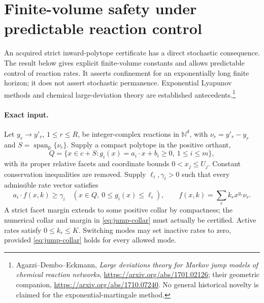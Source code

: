 \documentclass[11pt]{article}
\theoremstyle{definition}
\theoremstyle{remark}
\numberwithin{equation}{section}
\begin{document}
\section{Finite-volume safety under predictable reaction control}
\label{app:jump-safety}

An acquired strict inward-polytope certificate has a direct stochastic
consequence. The result below gives explicit finite-volume constants and
allows predictable control of reaction rates. It asserts confinement for
an exponentially long finite horizon; it does not assert stochastic
permanence. Exponential Lyapunov methods and chemical large-deviation
theory are established antecedents.\footnote{Agazzi--Dembo--Eckmann,
\emph{Large deviations theory for Markov jump models of chemical reaction
networks}, \url{https://arxiv.org/abs/1701.02126}; their geometric companion,
\url{https://arxiv.org/abs/1710.07240}. No general historical novelty is
claimed for the exponential-martingale method.}

\paragraph{Exact input.}
Let $y_r\to y'_r$, $1\le r\le R$, be integer-complex reactions in
$\mathbb N^d$, with $\nu_r=y'_r-y_r$ and
$S=\operatorname{span}_{\mathbb R}\{\nu_r\}$. Supply a compact polytope
in the positive orthant,
\[
 Q=\{x\in c+S:g_i(x)=a_i\cdot x+b_i\ge0,
                         \ 1\le i\le m\},
\]
with its proper relative facets and coordinate bounds $0<x_j\le U_j$.
Constant conservation inequalities are removed. Supply
$\ell_i,\gamma_i>0$ such that every admissible rate vector satisfies
\begin{equation}
 a_i\cdot f(x,k)\ge\gamma_i\quad
 (x\in Q,\ 0\le g_i(x)\le\ell_i),\qquad
 f(x,k)=\sum_r k_r x^{y_r}\nu_r.
 \label{eq:jump-collar}
\end{equation}
A strict facet margin extends to some positive collar by compactness;
the numerical collar and margin in \eqref{eq:jump-collar} must actually
be certified. Active rates satisfy $0\le k_r\le K$. Switching modes
may set inactive rates to zero, provided \eqref{eq:jump-collar} holds
for every allowed mode.
\end{document}
